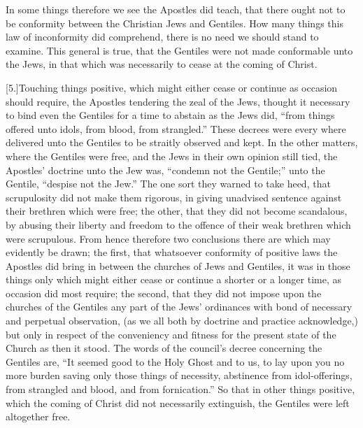 In some things therefore we see the Apostles did teach, that there ought not to be conformity between the Christian Jews and Gentiles. How many things this law of inconformity did comprehend, there is no need we should stand to examine. This general is true, that the Gentiles were not made conformable unto the Jews, in that which was necessarily to cease at the coming of Christ.

[5.]Touching things positive, which might either cease or continue as occasion should require, the Apostles tendering the zeal of the Jews, thought it necessary to bind even the Gentiles for a time to abstain as the Jews did, “from things offered unto idols, from blood, from strangled.” These decrees were every where delivered unto the Gentiles to be straitly observed and kept. In the other matters, where the Gentiles were free, and the Jews in their own opinion still tied, the Apostles’ doctrine unto the Jew was, “condemn not the Gentile;” unto the Gentile, “despise not the Jew.” The one sort they warned to take heed, that scrupulosity did not make them rigorous, in giving unadvised sentence against their brethren which were free; the other, that they did not become scandalous, by abusing their liberty and freedom to the offence of their weak brethren which were scrupulous. From hence therefore two conclusions there are which may evidently be drawn; the first, that whatsoever conformity of  positive laws the Apostles did bring in between the churches of Jews and Gentiles, it was in those things only which might either cease or continue a shorter or a longer time, as occasion did most require; the second, that they did not impose upon the churches of the Gentiles any part of the Jews’ ordinances with bond of necessary and perpetual observation, (as we all both by doctrine and practice acknowledge,) but only in respect of the conveniency and fitness for the present state of the Church as then it stood. The words of the council’s decree concerning the Gentiles are, “It seemed good to the Holy Ghost and to us, to lay upon you no more burden saving only those things of necessity, abstinence from idol-offerings, from strangled and blood, and from fornication.” So that in other things positive, which the coming of Christ did not necessarily extinguish, the Gentiles were left altogether free.

